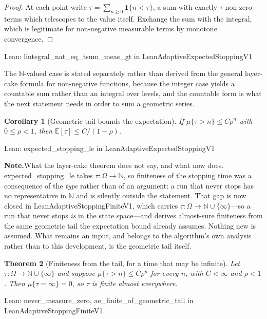 \documentclass[conference]{IEEEtran}
\newtheorem{theorem}{Theorem}
\newtheorem{corollary}[theorem]{Corollary}
\theoremstyle{definition}
\newcommand{\lean}[1]{\textsf{\footnotesize #1}}
\newcommand{\leanbox}[1]{%
  \par\vspace{2pt}\noindent
  {\footnotesize\textsf{Lean: #1}}\par\vspace{2pt}}
\newif\ifshownotes\shownotestrue
\newcommand{\NOTEPAR}[1]{\ifshownotes\par\vspace{2pt}\noindent%
  {\color{notecol}\textsf{\footnotesize\textbf{Note.}\;#1}}\par\vspace{2pt}\fi}
\begin{document}
\begin{proof}
At each point write $\tau=\sum_{n\ge0}\mathbf{1}\{n<\tau\}$, a sum with exactly $\tau$
non-zero terms which telescopes to the value itself. Exchange the sum with the integral, which
is legitimate for non-negative measurable terms by monotone convergence.
\end{proof}

\leanbox{\lean{lintegral\_nat\_eq\_tsum\_meas\_gt} in
\lean{LeanAdaptiveExpectedStoppingV1}}

The $\mathbb{N}$-valued case is stated separately rather than derived from the general
layer-cake formula for non-negative functions, because the integer case yields a countable sum
rather than an integral over levels, and the countable form is what the next statement needs
in order to sum a geometric series.

\begin{corollary}[Geometric tail bounds the expectation]
\label{cor:expstop}
If $\mu\{\tau>n\}\le C\rho^{n}$ with $0\le\rho<1$, then
$\mathbb{E}[\tau]\le C/(1-\rho)$.
\end{corollary}

\leanbox{\lean{expected\_stopping\_le} in \lean{LeanAdaptiveExpectedStoppingV1}}
\NOTEPAR{What the layer-cake theorem does not say, and what now does.
\lean{expected\_stopping\_le} takes $\tau:\Omega\to\mathbb{N}$, so finiteness of the stopping
time was a consequence of the \emph{type} rather than of an argument: a run that never stops
has no representative in $\mathbb{N}$ and is silently outside the statement. That gap is now
closed in \lean{LeanAdaptiveStoppingFiniteV1}, which carries
$\tau:\Omega\to\mathbb{N}\cup\{\infty\}$---so a run that never stops \emph{is} in the state
space---and derives almost-sure finiteness from the same geometric tail the expectation bound
already assumes. Nothing new is assumed. What remains an input, and belongs to the
algorithm's own analysis rather than to this development, is the geometric tail itself.}

\begin{theorem}[Finiteness from the tail, for a time that may be infinite]
\label{thm:aefinite}
Let $\tau:\Omega\to\mathbb{N}\cup\{\infty\}$ and suppose
$\mu\{\tau>n\}\le C\rho^{n}$ for every $n$, with $C<\infty$ and $\rho<1$. Then
$\mu\{\tau=\infty\}=0$, so $\tau$ is finite almost everywhere.
\end{theorem}

\leanbox{\lean{never\_measure\_zero}, \lean{ae\_finite\_of\_geometric\_tail} in
\lean{LeanAdaptiveStoppingFiniteV1}}
\end{document}
